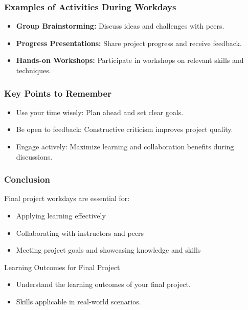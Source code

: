 \documentclass[aspectratio=169]{beamer}
\begin{document}
\begin{frame}[fragile]
    \frametitle{Examples of Activities During Workdays}
    \begin{itemize}
        \item \textbf{Group Brainstorming:}
        Discuss ideas and challenges with peers.
        \item \textbf{Progress Presentations:}
        Share project progress and receive feedback.
        \item \textbf{Hands-on Workshops:}
        Participate in workshops on relevant skills and techniques.
    \end{itemize}
\end{frame}

\begin{frame}[fragile]
    \frametitle{Key Points to Remember}
    \begin{itemize}
        \item Use your time wisely: Plan ahead and set clear goals.
        \item Be open to feedback: Constructive criticism improves project quality.
        \item Engage actively: Maximize learning and collaboration benefits during discussions.
    \end{itemize}
\end{frame}

\begin{frame}[fragile]
    \frametitle{Conclusion}
    Final project workdays are essential for:
    \begin{itemize}
        \item Applying learning effectively
        \item Collaborating with instructors and peers
        \item Meeting project goals and showcasing knowledge and skills
    \end{itemize}
\end{frame}

\begin{frame}[fragile]{Learning Outcomes for Final Project}
    \begin{itemize}
        \item Understand the learning outcomes of your final project.
        \item Skills applicable in real-world scenarios.
    \end{itemize}
\end{frame}
\end{document}

